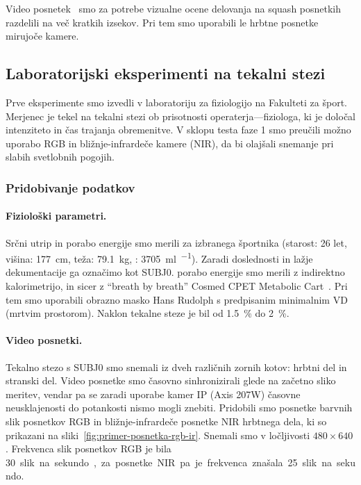 Video posnetek~\cite{squashtv2014squash} smo za potrebe vizualne ocene delovanja na squash posnetkih razdelili na več kratkih izsekov. Pri tem smo uporabili le hrbtne posnetke mirujoče kamere. 







\subsection{Laboratorijski eksperimenti na tekalni stezi}
Prve eksperimente smo izvedli v laboratoriju za fiziologijo na Fakulteti za šport. Merjenec je tekel na tekalni stezi ob prisotnosti operaterja---fiziologa, ki je določal intenziteto in čas trajanja obremenitve. V sklopu testa faze 1 smo preučili možno uporabo RGB in bližnje-infrardeče kamere (NIR), da bi olajšali snemanje pri slabih svetlobnih pogojih.


\subsubsection{Pridobivanje podatkov}
\paragraph{Fiziolo\v{s}ki parametri.}
Srčni utrip in porabo energije smo merili za izbranega športnika (starost: 26 let, višina: \SI{177}{\cm}, teža: \SI{79.1}{\kg}, \vomax: \SI{3705}{\ml\per\min}). Zaradi doslednosti in lažje dekumentacije ga označimo kot SUBJ0. porabo energije smo merili z indirektno kalorimetrijo, in sicer z ``breath by breath'' Cosmed CPET Metabolic Cart~\cite{beaver1973line}. Pri tem smo uporabili obrazno masko Hans Rudolph s predpisanim minimalnim VD (mrtvim prostorom). Naklon tekalne steze je bil od \SI{1.5}{\%} do \SI{2}{\%}.

\paragraph{Video posnetki.}
Tekalno stezo s SUBJ0 smo snemali iz dveh različnih zornih kotov: hrbtni del in stranski del. Video posnetke smo časovno sinhronizirali glede na začetno sliko meritev, vendar pa se zaradi uporabe kamer IP (Axis 207W) časovne neusklajenosti do potankosti nismo mogli znebiti. Pridobili smo posnetke barvnih slik posnetkov RGB in bližnje-infrardeče posnetke NIR hrbtnega dela, ki so prikazani na sliki~\ref{fig:primer-posnetka-rgb-ir}. Snemali smo v ločljivosti $480 \times 640$. Frekvenca slik posnetkov RGB je bila \SI{30} slik na sekundo, za posnetke NIR pa je frekvenca znašala \SI{25} slik na sekundo.  

